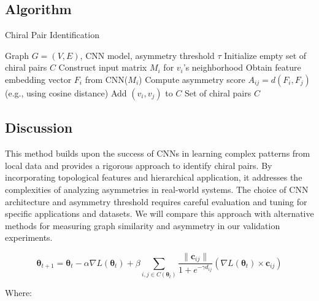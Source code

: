 \documentclass[12pt, a4paper]{article}
\begin{document}
\subsection{Algorithm}


\begin{algorithm}[H]
\caption{Chiral Pair Identification}
\begin{algorithmic}[1]
\Require Graph $G=(V,E)$, CNN model, asymmetry threshold $\tau$
\State Initialize empty set of chiral pairs $C$
    \State Construct input matrix $M_i$ for $v_i$'s neighborhood
    \State Obtain feature embedding vector $F_i$ from CNN($M_i$)
\EndFor
{}
    \State Compute asymmetry score $A_{ij} = d(F_i, F_j)$ (e.g., using cosine distance)
        \State Add $(v_i, v_j)$ to $C$
    \EndIf
\EndFor
\State \Return Set of chiral pairs $C$
\end{algorithmic}
\end{algorithm}


\subsection{Discussion}

This method builds upon the success of CNNs in learning complex patterns from local data and provides a rigorous approach to identify chiral pairs.  By incorporating topological features and hierarchical application, it addresses the complexities of analyzing asymmetries in real-world systems.  The choice of CNN architecture and asymmetry threshold requires careful evaluation and tuning for specific applications and datasets.  We will compare this approach with alternative methods for measuring graph similarity and asymmetry in our validation experiments.

\begin{equation} \label{eq:cgd_sigmoid_final}
\boldsymbol{\theta}_{t+1} = \boldsymbol{\theta}_t - \alpha \nabla L(\boldsymbol{\theta}_t) + \beta \sum_{i,j \in C(\boldsymbol{\theta}_t)}  \frac{\| \mathbf{c}_{ij} \|}{1 + e^{-\gamma d_{ij}}} (\nabla L(\boldsymbol{\theta}_t) \times \mathbf{c}_{ij})
\end{equation}

Where:
\end{document}
